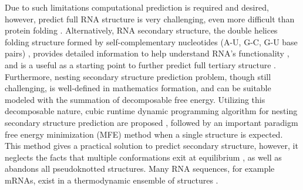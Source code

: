 Due to such limitations computational prediction is required and desired, however, predict full RNA structure is very challenging, even more difficult than protein folding \cite{mccaskill:1990}. 
Alternatively, RNA secondary structure, 
the double helices folding structure formed by self-complementary nucleotides (A-U, G-C, G-U base pairs) 
\cite{Tinoco+Bustamante:1999},
provides detailed information to help understand RNA's 
functionality 
\cite{tinoco+:1971},
and is a useful as a starting point to further predict full tertiary structure \cite{auron+:1982}.
Furthermore, nesting secondary structure prediction problem, though still challenging, is well-defined in mathematics formation, and can be suitable modeled with the summation of decomposable free energy. 
Utilizing this decomposable nature, 
cubic runtime dynamic programming algorithm 
for nesting secondary structure prediction are proposed \cite{nussinov+jacobson:1980}, 
followed by an important paradigm free energy minimization (MFE) method \cite{zuker+stiegler:1981} when a single structure is expected.
This method gives a practical solution to predict secondary structure, however, it neglects the facts that multiple conformations exit at equilibrium \cite{mathews:2004}, as well as abandons all pseudoknotted structures.
Many RNA sequences, for example mRNAs, exist in a thermodynamic ensemble of structures 
\cite{lai+:2018}.%



